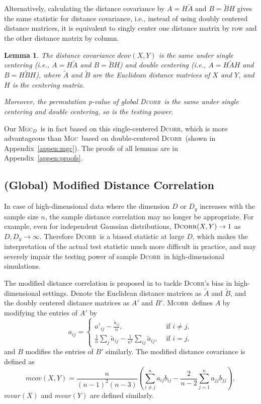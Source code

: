 \documentclass[11pt]{article}
\providecommand{\sct}[1]{{\normalfont\textsc{#1}}}
\newcommand{\Mgc}{\sct{Mgc}}
\newcommand{\Mgcd}{\sct{Mgc$_D$}}
\newcommand{\Dcorr}{\sct{Dcorr}}
\newcommand{\Mcorr}{\sct{Mcorr}}
\newtheorem{lem}{Lemma}
\begin{document}
Alternatively, calculating the distance covariance by $A=H\tilde{A}$ and $B=\tilde{B}H$ gives the same statistic for distance covariance, i.e., instead of using doubly centered distance matrices, it is equivalent to singly center one distance matrix by row and the other distance matrix by column.
\begin{lem}
The distance covariance $dcov(X,Y)$ is the same under single centering (i.e., $A=H\tilde{A}$ and $B=\tilde{B}H$) and double centering (i.e., $A=H\tilde{A}H$ and $B=H\tilde{B}H$), where $\tilde{A}$ and $\tilde{B}$ are the Euclidean distance matrices of $X$ and $Y$, and $H$ is the centering matrix. 

Moreover, the permutation p-value of global \Dcorr~is the same under single centering and double centering, so is the testing power.
\end{lem}
Our \Mgcd~is in fact based on this single-centered \Dcorr, which is more advantageous than \Mgc~based on double-centered \Dcorr~(shown in Appendix~\ref{appen:mgc}). The proofs of all lemmas are in Appendix~\ref{appen:proofs}.



\subsection{(Global) Modified Distance Correlation}
\label{appen:mcorr}
In case of high-dimensional data where the dimension $D$ or $D_y$ increases with the sample size $n$, the sample distance correlation may no longer be appropriate. For example, even for independent Gaussian distributions, $\Dcorr(X,Y) \rightarrow 1$ as $D, D_y \rightarrow \infty$. Therefore \Dcorr~is a biased statistic at large $D$, which makes the interpretation of the actual test statistic much more difficult in practice, and may severely impair the testing power of sample \Dcorr~in high-dimensional simulations.

The modified distance correlation is proposed in \cite{SzekelyRizzo2013a} to tackle \Dcorr's bias in high-dimensional settings. Denote the Euclidean distance matrices as $\tilde{A}$ and $\tilde{B}$, and the doubly centered distance matrices as $A'$ and $B'$.  \Mcorr~defines $A$ by modifying the entries of $A'$ by
\[a_{ij} = \left\{
  \begin{array}{lr}
    a'_{ij}-\frac{\tilde{a}_{ij}}{n}, & \mbox{ if } i \neq j, \\
    \frac{1}{n}\sum_{j}\tilde{a}_{ij}-\frac{1}{n^2}\sum_{ij}\tilde{a}_{ij}, &\mbox{ if } i = j,
  \end{array}
\right.
\]
and  $B$ modifies the entries of $B'$ similarly.
The modified distance covariance is defined as
\begin{equation*}
mcov(X,Y)=\frac{n}{(n-1)^2(n-3)}\left(\sum_{i \neq j}^{n}a_{ij}b_{ij}-\frac{2}{n-2}\sum_{j=1}^{n}a_{jj}b_{jj}\right),
\end{equation*}
$mvar(X)$ and $mvar(Y)$ are defined similarly.
\end{document}
